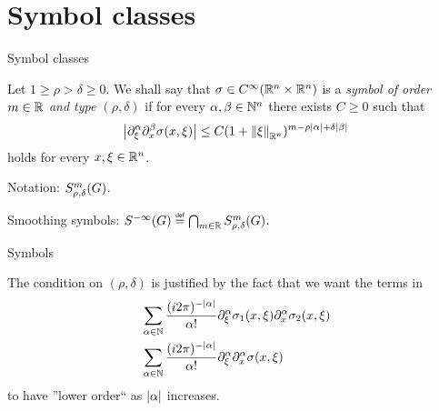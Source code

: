 \documentclass{beamer}
\begin{document}
\section{Symbol classes}

\begin{frame}
    {Symbol classes}

    \begin{definition}

        Let $1 \geq \rho > \delta \geq 0$.
        We shall say that $\sigma \in {C^\infty(\mathbb{R}^n \times \mathbb{R}^n)}$ is a \emph{symbol of order $m \in \mathbb{R}$ and type $(\rho, \delta)$}
        if for every $\alpha, \beta \in \mathbb{N}^n$
        there exists $C \geq 0$ such that
        \begin{align*}
            \abs {%
                \iD {\xi^\alpha}
                \iD {x^\beta}
                \sigma(x, \xi)
            } \leq
            C (1 + \norm [\R^n] \xi)^{m - \rho \abs \alpha + \delta \abs \beta}
        \end{align*}
        holds for every $x, \xi \in \mathbb{R}^n$.

        \pause
        Notation: $S^{m}_{\rho, \delta}(G)$.
    \end{definition}

    \pause
    Smoothing symbols: $\SmoothingSymbols \defeq \bigcap_{m \in \R} \SymbolClass m {\rho, \delta}$.
\end{frame}

\begin{frame}
    {Symbols}

    The condition on $(\rho, \delta)$ is justified by the fact that we want the terms in
    \begin{align*}
        &\sum_{\alpha \in \N}
        \frac {(i \turn)^{-\abs \alpha}} {\alpha!}
        \iD {\xi^\alpha} \sigma_1(x, \xi)
        \iD {x^\alpha} \sigma_2(x, \xi)\\
        &\sum_{\alpha \in \N}
        \frac {(i \turn)^{-\abs \alpha}} {\alpha!}
        \iD {\xi^\alpha}
        \iD {x^\alpha} \sigma(x, \xi)
    \end{align*}
    to have ''lower order`` as $\left|{\alpha}\right|$ increases.
\end{frame}
\end{document}
